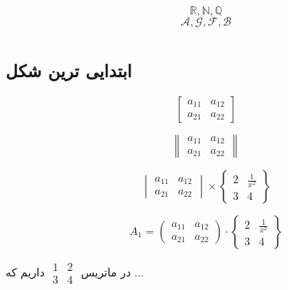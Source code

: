 \documentclass{book}
\begin{document}
\[
\mathbb{R, N, Q}
\]
\[
\mathcal{A, G, F, B}
\]

\chapter{}
\BNaz
\section{ابتدایی ترین شکل}
\[
\begin{bmatrix}
	a_{11} & a_{12}\\
	a_{21} & a_{22}
\end{bmatrix}
\]

\[
\begin{Vmatrix}
	a_{11} & a_{12}\\
	a_{21} & a_{22}
\end{Vmatrix}
\]

\[
\begin{vmatrix}
	a_{11} & a_{12}\\
	a_{21} & a_{22}
\end{vmatrix} \times
\begin{Bmatrix}
	2 & \tfrac{1}{x^2} \\
	3 & 4
\end{Bmatrix}
\]

\[
A_{1} =
\begin{pmatrix}
	a_{11} & a_{12}\\
	a_{21} & a_{22}
\end{pmatrix} \cdot 
\begin{Bmatrix}
	2 & \tfrac{1}{x^2} \\
	3 & 4
\end{Bmatrix}
\]

در ماتریس 
$
\begin{smallmatrix}
	1 & 2\\
	3 & 4
\end{smallmatrix}
$
داریم که $ \dots $
\end{document}
